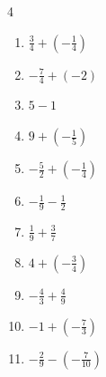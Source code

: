 \begin{multicols}{4}
\begin{enumerate}

  \item $\displaystyle \frac{3}{4} + \left(-\frac{1}{4}\right)$


  \item $\displaystyle -\frac{7}{4} + \left(-2\right)$


  \item $\displaystyle 5 - 1$

        \phantom{$\displaystyle =4$}

  \item $\displaystyle 9 + \left(-\frac{1}{5}\right)$


  \item $\displaystyle -\frac{5}{2} + \left(-\frac{1}{4}\right)$


  \item $\displaystyle -\frac{1}{9} - \frac{1}{2}$


  \item $\displaystyle \frac{1}{9} + \frac{3}{7}$


\columnbreak %

  \item $\displaystyle 4 + \left(-\frac{3}{4}\right)$


  \item $\displaystyle -\frac{4}{3} + \frac{4}{9}$


  \item $\displaystyle -1 + \left(-\frac{7}{3}\right)$


  \item $\displaystyle -\frac{2}{9} - \left(-\frac{7}{10}\right)$



\end{enumerate}
\end{multicols}
